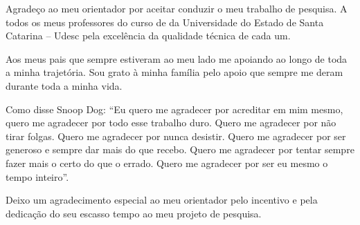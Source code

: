 \begin{agradecimentos}
	Agradeço ao meu orientador por aceitar conduzir o meu trabalho de pesquisa.
	A todos os meus professores do curso de da Universidade do Estado de Santa Catarina – Udesc pela excelência da qualidade técnica de cada um.

	Aos meus pais que sempre estiveram ao meu lado me apoiando ao longo de toda a minha trajetória. Sou grato à minha família pelo apoio que sempre me deram durante toda a minha vida.

	Como disse Snoop Dog: ``Eu quero me agradecer por acreditar em mim mesmo, quero me agradecer por todo esse trabalho duro. Quero me agradecer por não tirar folgas. Quero me agradecer por nunca desistir. Quero me agradecer por ser generoso e sempre dar mais do que recebo. Quero me agradecer por tentar sempre fazer mais o certo do que o errado. Quero me agradecer por ser eu mesmo o tempo inteiro''.

	Deixo um agradecimento especial ao meu orientador pelo incentivo e pela dedicação do seu escasso tempo ao meu projeto de pesquisa.


\end{agradecimentos}

